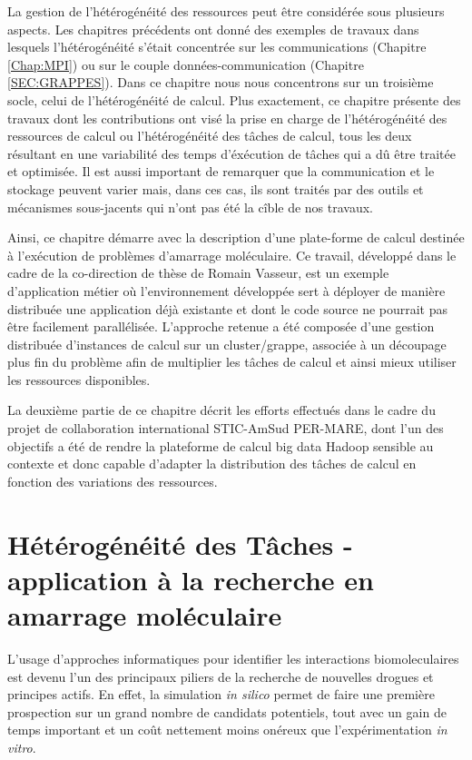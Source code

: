 \begin{resume}
La gestion de l'hétérogénéité des ressources peut être considérée sous plusieurs aspects. Les chapitres précédents ont donné des exemples de travaux dans lesquels l'hétérogénéité s'était concentrée sur les communications (Chapitre \ref{Chap:MPI}) ou sur le couple données-communication (Chapitre \ref{SEC:GRAPPES}). Dans ce chapitre nous nous concentrons sur un troisième socle, celui de l'hétérogénéité de calcul. Plus exactement, ce chapitre présente des travaux dont les contributions ont visé la prise en charge de l'hétérogénéité des ressources de calcul ou l'hétérogénéité des tâches de calcul, tous les deux résultant en une variabilité des temps d'éxécution de tâches qui a dû être traitée et optimisée. Il est aussi important de remarquer que la communication et le stockage peuvent varier mais, dans ces cas, ils sont traités par des outils et mécanismes sous-jacents qui n'ont pas été la cîble de nos travaux.

Ainsi, ce chapitre démarre avec la description d'une plate-forme de calcul destinée à l'exécution de problèmes d'amarrage moléculaire. Ce travail, développé dans le cadre de la co-direction de thèse de Romain Vasseur, est un exemple d'application métier où l'environnement développée sert à déployer de manière distribuée une application déjà existante et dont le code source ne pourrait pas être facilement parallélisée. L'approche retenue a été composée d'une gestion distribuée d'instances de calcul sur un cluster/grappe, associée à un découpage plus fin du problème afin de multiplier les tâches de calcul et ainsi mieux utiliser les ressources disponibles.

La deuxième partie de ce chapitre décrit les efforts effectués dans le cadre du projet de collaboration international STIC-AmSud PER-MARE, dont l'un des objectifs a été de rendre la plateforme de calcul big data Hadoop sensible au contexte et donc capable d'adapter la distribution des tâches de calcul en fonction des variations des ressources.

\end{resume}

\section{Hétérogénéité des Tâches  - application à la recherche en amarrage moléculaire} \label{sec:Vasseur}

L'usage d'approches informatiques pour identifier les interactions biomoleculaires est devenu l'un des principaux piliers de la recherche de nouvelles drogues et principes actifs. En effet, la simulation \emph{in silico} permet de faire une première prospection sur un grand nombre de candidats potentiels, tout avec un gain de temps important et un coût nettement moins onéreux que l'expérimentation \emph{in vitro}. 

